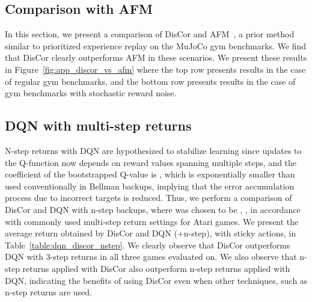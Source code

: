 \documentclass[jmlr]{article}
\begin{document}
\subsection{Comparison with AFM}
\label{sec:afm_comparison}
In this section, we present a comparison of DisCor and AFM~\citep{fu19diagnosing}, a prior method similar to prioritized experience replay on the MuJoCo gym benchmarks. We find that DisCor clearly outperforms AFM in these scenarios. We present these results in Figure~\ref{fig:app_discor_vs_afm} where the top row presents results in the case of regular gym benchmarks, and the bottom row presents results in the case of gym benchmarks with stochastic reward noise.

\subsection{DQN with multi-step returns}
\label{sec:dqn_multi_step}
N-step returns with DQN are hypothesized to stabilize learning since updates to the Q-function now depends on reward values spanning multiple steps, and the coefficient of the bootstrapped Q-value is , which is exponentially smaller than  used conventionally in Bellman backups, implying that the error accumulation process due to incorrect targets is reduced. Thus, we perform a comparison of DisCor and DQN with n-step backups, where  was chosen to be , , in accordance with commonly used multi-step return settings for Atari games. We present the average return obtained by DisCor and DQN (+n-step), with sticky actions, in Table~\ref{table:dqn_discor_nstep}. We clearly observe that DisCor outperforms DQN with 3-step returns in all three games evaluated on. We also observe that n-step returns applied with DisCor also outperform n-step returns applied with DQN, indicating the benefits of using DisCor even when other techniques, such as n-step returns are used.
\end{document}
